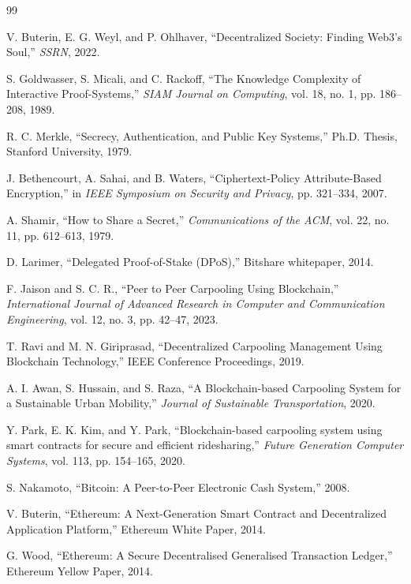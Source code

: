 \documentclass[12pt]{report}
\theoremstyle{plain}
\theoremstyle{definition}
\theoremstyle{remark}
\begin{document}
\begin{thebibliography}{99}

V. Buterin, E. G. Weyl, and P. Ohlhaver, ``Decentralized Society: Finding Web3's Soul,'' \textit{SSRN}, 2022.

S. Goldwasser, S. Micali, and C. Rackoff, ``The Knowledge Complexity of Interactive Proof-Systems,'' \textit{SIAM Journal on Computing}, vol. 18, no. 1, pp. 186--208, 1989.

R. C. Merkle, ``Secrecy, Authentication, and Public Key Systems,'' Ph.D. Thesis, Stanford University, 1979.

J. Bethencourt, A. Sahai, and B. Waters, ``Ciphertext-Policy Attribute-Based Encryption,'' in \textit{IEEE Symposium on Security and Privacy}, pp. 321--334, 2007.

A. Shamir, ``How to Share a Secret,'' \textit{Communications of the ACM}, vol. 22, no. 11, pp. 612--613, 1979.

D. Larimer, ``Delegated Proof-of-Stake (DPoS),'' Bitshare whitepaper, 2014.

F. Jaison and S. C. R., ``Peer to Peer Carpooling Using Blockchain,'' \textit{International Journal of Advanced Research in Computer and Communication Engineering}, vol. 12, no. 3, pp. 42--47, 2023.

T. Ravi and M. N. Giriprasad, ``Decentralized Carpooling Management Using Blockchain Technology,'' IEEE Conference Proceedings, 2019.

A. I. Awan, S. Hussain, and S. Raza, ``A Blockchain-based Carpooling System for a Sustainable Urban Mobility,'' \textit{Journal of Sustainable Transportation}, 2020.

Y. Park, E. K. Kim, and Y. Park, ``Blockchain-based carpooling system using smart contracts for secure and efficient ridesharing,'' \textit{Future Generation Computer Systems}, vol. 113, pp. 154--165, 2020.

S. Nakamoto, ``Bitcoin: A Peer-to-Peer Electronic Cash System,'' 2008.

V. Buterin, ``Ethereum: A Next-Generation Smart Contract and Decentralized Application Platform,'' Ethereum White Paper, 2014.

G. Wood, ``Ethereum: A Secure Decentralised Generalised Transaction Ledger,'' Ethereum Yellow Paper, 2014.


\end{thebibliography}
\end{document}
